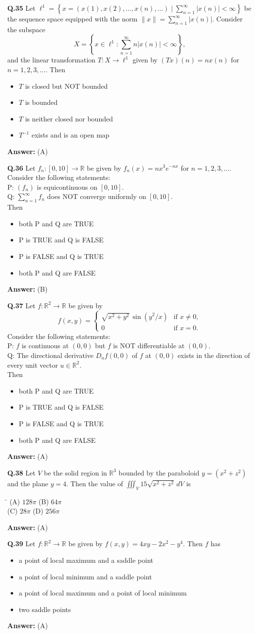 \documentclass[11pt,a4paper]{article}
\newcommand{\optsfourA}[4]{%
  \begin{tabbing}
    \hspace{0.48\linewidth}\=\kill
    (A) #1 \> (B) #2 \\[2pt]
    (C) #3 \> (D) #4
  \end{tabbing}%
}
\newcommand{\optslistA}[4]{%
  \begin{itemize}
    \setlength{\itemsep}{2pt}\setlength{\parskip}{0pt}
    \item[(A)] #1
    \item[(B)] #2
    \item[(C)] #3
    \item[(D)] #4
  \end{itemize}%
}
\newcommand{\ans}[1]{\textbf{Answer:} #1\par\medskip}
\begin{document}
\textbf{Q.35} Let $\ell^1 = \left\{x = (x(1), x(2), \dots, x(n), \dots) \mid \sum_{n=1}^{\infty} |x(n)| < \infty\right\}$ be the sequence space equipped with the norm $\|x\| = \sum_{n=1}^{\infty} |x(n)|$. Consider the subspace
\[
  X = \left\{x \in \ell^1 : \sum_{n=1}^{\infty} n |x(n)| < \infty\right\},
\]
and the linear transformation $T : X \to \ell^1$ given by $(Tx)(n) = n x(n)$ for $n = 1, 2, 3, \dots$. Then
\optslistA{$T$ is closed but NOT bounded}{$T$ is bounded}{$T$ is neither closed nor bounded}{$T^{-1}$ exists and is an open map}
\ans{(A)}

\textbf{Q.36} Let $f_n : [0, 10] \to \mathbb{R}$ be given by $f_n(x) = n x^3 e^{-nx}$ for $n = 1, 2, 3, \dots$.\\
Consider the following statements:\\
P: $(f_n)$ is equicontinuous on $[0, 10]$.\\
Q: $\sum_{n=1}^{\infty} f_n$ does NOT converge uniformly on $[0, 10]$.\\
Then
\optslistA{both P and Q are TRUE}{P is TRUE and Q is FALSE}{P is FALSE and Q is TRUE}{both P and Q are FALSE}
\ans{(B)}

\textbf{Q.37} Let $f : \mathbb{R}^2 \to \mathbb{R}$ be given by
\[
  f(x, y) = \begin{cases}
    \sqrt{x^2 + y^2}\,\sin(y^2/x) & \text{if } x \neq 0, \\
    0 & \text{if } x = 0.
  \end{cases}
\]
Consider the following statements:\\
P: $f$ is continuous at $(0, 0)$ but $f$ is NOT differentiable at $(0, 0)$.\\
Q: The directional derivative $D_u f(0, 0)$ of $f$ at $(0, 0)$ exists in the direction of every unit vector $u \in \mathbb{R}^2$.\\
Then
\optslistA{both P and Q are TRUE}{P is TRUE and Q is FALSE}{P is FALSE and Q is TRUE}{both P and Q are FALSE}
\ans{(A)}

\textbf{Q.38} Let $V$ be the solid region in $\mathbb{R}^3$ bounded by the paraboloid $y = (x^2 + z^2)$ and the plane $y = 4$. Then the value of $\displaystyle\iiint_V 15\sqrt{x^2 + z^2}\,dV$ is
\optsfourA{$128\pi$}{$64\pi$}{$28\pi$}{$256\pi$}
\ans{(A)}

\textbf{Q.39} Let $f : \mathbb{R}^2 \to \mathbb{R}$ be given by $f(x, y) = 4xy - 2x^2 - y^4$. Then $f$ has
\optslistA{a point of local maximum and a saddle point}{a point of local minimum and a saddle point}{a point of local maximum and a point of local minimum}{two saddle points}
\ans{(A)}
\end{document}
